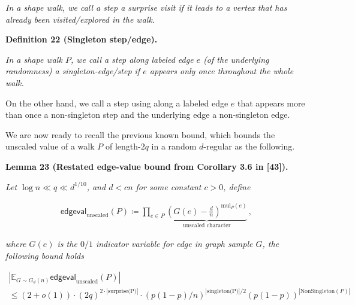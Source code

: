 \documentclass[10pt,a4paper]{article}
\begin{document}
\emph{In a shape walk, we call a step a surprise visit if it leads to a vertex that has already been visited/explored in the walk.}\par







\par\medskip\noindent\textbf{
\textbf{Definition 22}\textbf{ }(Singleton step/edge)\textbf{.}
}\par



{\itshape In a shape walk $P$, we call a step along labeled edge $e$ (of the underlying randomness) a singleton-edge/step if $e$ appears only once throughout the whole walk.

On the other hand, we call a step using along a labeled edge $e$ that appears more than once a non-singleton step and the underlying edge a non-singleton edge.}\par






We are now ready to recall the previous known bound, which bounds the unscaled value of a walk $P$ of length-$2q$ in a random $d$-regular as the following.\par





\par\medskip\noindent\textbf{
\textbf{Lemma 23}\textbf{ }(Restated edge-value bound from Corollary 3.6 in [43])\textbf{.}
}\par



\emph{Let $\log n\ll q\ll d^{1/10}$, and $d<cn$ for some constant $c>0$, define}\par


\[\begin{gathered}
\mathsf{edgeval}_{\text{unscaled}}(P)\coloneqq\prod_{e\in P}\underbrace{(G(e)-\frac{d}{n})^{\text{mul}_{P}(e)}}_{\text{unscaled character}}\,,
\end{gathered}\]


\emph{where $G(e)$ is the $0/1$ indicator variable for edge in graph sample $G$,
the following bound holds}\par


\[\begin{gathered}
\displaystyle|\mathbb{E}_{G\sim G_{d}(n)}\mathsf{edgeval}_{\text{unscaled}}(P)| \\
\displaystyle\leq(2+o(1))\cdot(2q)^{2\cdot|\text{surprise(P)}|}\cdot(p(1-p)/n)^{|\text{singleton(P)}|/2}(p(1-p))^{|\text{NonSingleton}(P)|}
\end{gathered}\]
\end{document}
